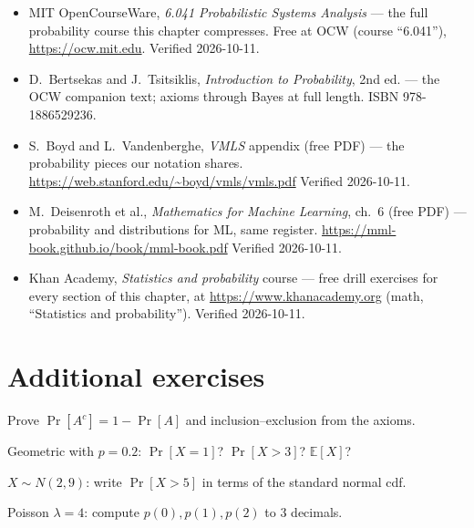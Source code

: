\begin{itemize}
\item MIT OpenCourseWare, \emph{6.041 Probabilistic Systems Analysis}
--- the full probability course this chapter compresses. Free at OCW
(course ``6.041''), \url{https://ocw.mit.edu}. Verified 2026-10-11.
\item D.~Bertsekas and J.~Tsitsiklis, \emph{Introduction to
Probability}, 2nd ed. --- the OCW companion text; axioms through
Bayes at full length. ISBN 978-1886529236.
\item S.~Boyd and L.~Vandenberghe, \emph{VMLS} appendix (free PDF) ---
the probability pieces our notation shares.\newline
\url{https://web.stanford.edu/~boyd/vmls/vmls.pdf}
Verified 2026-10-11.
\item M.~Deisenroth et al., \emph{Mathematics for Machine Learning},
ch.~6 (free PDF) --- probability and distributions for ML, same
register.\newline
\url{https://mml-book.github.io/book/mml-book.pdf}
Verified 2026-10-11.
\item Khan Academy, \emph{Statistics and probability} course --- free
drill exercises for every section of this chapter, at
\url{https://www.khanacademy.org} (math, ``Statistics and
probability''). Verified 2026-10-11.
\end{itemize}

\section*{Additional exercises}

\begin{exercise}[easy]
Prove $\Pr[A^{c}]=1-\Pr[A]$ and inclusion--exclusion from the axioms.
\end{exercise}

\begin{exercise}[easy]
Geometric with $p=0.2$: $\Pr[X=1]$? $\Pr[X>3]$? $\mathbb E[X]$?
\end{exercise}

\begin{exercise}[easy]
$X\sim N(2,9)$: write $\Pr[X>5]$ in terms of the standard normal cdf.
\end{exercise}

\begin{exercise}[easy]
Poisson $\lambda=4$: compute $p(0),p(1),p(2)$ to 3 decimals.
\end{exercise}

